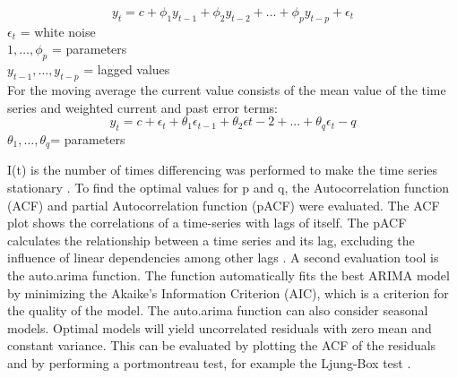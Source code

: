 	\[y_t = c + \phi_1 y_{t-1} + \phi_2 y_{t-2}+...+ \phi_p y_{t-p}+ \epsilon _t\]
	$\epsilon _t$ = white noise\\
	$1,…,\phi _p$ = parameters\\
	$y_{t-1},…, y_{t-p}$ = lagged values \\
	
	For the moving average the current value consists of the mean value of the time series and weighted current and past error terms: 
	\[y_t=c+\epsilon _t+\theta_1 \epsilon _{t-1}+\theta_2 \epsilon t-2+...+\theta_q \epsilon _t-q\]
	$\theta_1,…, \theta _q $= parameters
	
I(t) is the number of times differencing was performed to make the time series stationary \citep{Venkat2018}.
To find the optimal values for p and q, the Autocorrelation function (ACF) and partial Autocorrelation function (pACF) were evaluated. The ACF plot shows the correlations of a time-series with lags of itself.  The pACF calculates the relationship between a time series and its lag, excluding the influence of linear dependencies among other lags \citep{Prabhakaran2017}.
A second evaluation tool is the auto.arima function. The function automatically fits the best ARIMA model by minimizing the Akaike’s Information Criterion (AIC), which is a criterion for the quality of the model. The auto.arima function can also consider seasonal models. 
Optimal models will yield uncorrelated residuals with zero mean and constant variance. This can be evaluated by plotting the ACF of the residuals and by performing a portmontreau test, for example the Ljung-Box test \citep{Hyndman2018}.

	
